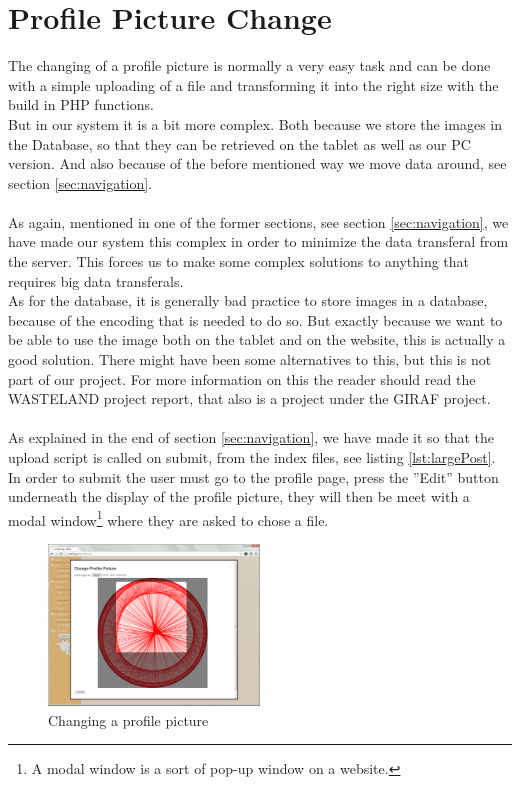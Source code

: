 \section{Profile Picture Change}
The changing of a profile picture is normally a very easy task and can be done with a simple uploading of a file and transforming it into the right size with the build in PHP functions.\\
But in our system it is a bit more complex. Both because we store the images in the Database, so that they can be retrieved on the tablet as well as our PC version. And also because of the before mentioned way we move data around, see section \ref{sec:navigation}.\\
\\
As again, mentioned in one of the former sections, see section \ref{sec:navigation}, we have made our system this complex in order to minimize the data transferal from the server. This forces us to make some complex solutions to anything that requires big data transferals.\\
As for the database, it is generally bad practice to store images in a database, because of the encoding that is needed to do so. But exactly because we want to be able to use the image both on the tablet and on the website, this is actually a good solution. There might have been some alternatives to this, but this is not part of our project. For more information on this the reader should read the WASTELAND project report, that also is a project under the GIRAF project.\\
\\	
As explained in the end of section \ref{sec:navigation}, we have made it so that the upload script is called on submit, from the index files, see listing \ref{lst:largePost}.\\
In order to submit the user must go to the profile page, press the ''Edit'' button underneath the display of the profile picture, they will then be meet with a modal window\footnote{A modal window is a sort of pop-up window on a website.} where they are asked to chose a file.

\begin{figure}[htbp]
	\centering
		\includegraphics[width=0.50\textwidth]{images/profilePicChange.png}
	\caption{Changing a profile picture}
	\label{fig:profilePicChange}
\end{figure}

